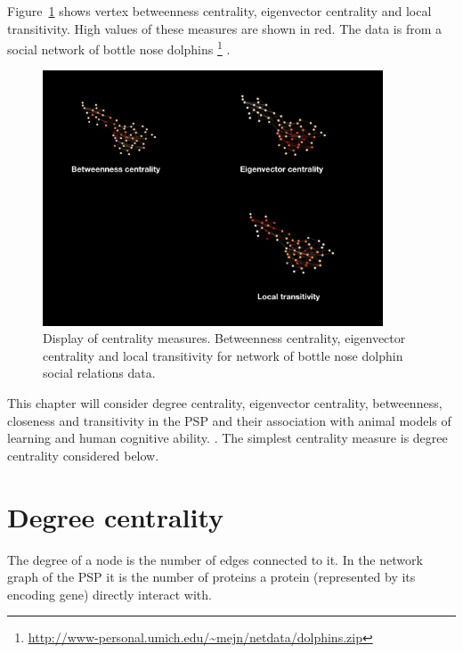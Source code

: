 Figure~\ref{fig:dolphin} shows vertex betweenness centrality, eigenvector centrality and local transitivity. High values of these measures are shown in red. The data is from a social network of bottle nose dolphins \footnote{\url{http://www-personal.umich.edu/~mejn/netdata/dolphins.zip}} \cite{lusseau2003bottlenose} .

\begin{figure}
    \centering
    \includegraphics[width=0.9\textwidth]{images/centrality2.002.png}
    \caption{Display of centrality measures. Betweenness centrality, eigenvector centrality and local transitivity for network of bottle nose dolphin social relations data. \cite{lusseau2003bottlenose}}
    \label{fig:dolphin}
\end{figure}

This chapter will consider degree centrality, eigenvector centrality, betweenness, closeness and transitivity in the PSP and their association with animal models of learning and human cognitive ability. . The simplest centrality measure is degree centrality \cite{newman2018networks} considered below. 

\section{Degree centrality}
\label{sec:degree centrality}

The degree of a node is the number of edges connected to it. In the network graph of the PSP it is the number of proteins a protein (represented by its encoding gene) directly interact with.


